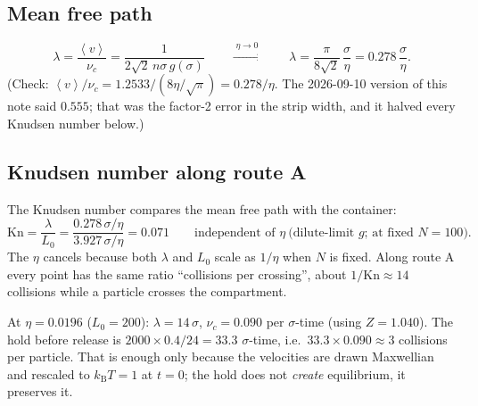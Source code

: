 \documentclass[11pt,a4paper]{article}
\newcommand{\kT}{k_{\mathrm B}T}
\newcommand{\ie}{i.e.\ }
\newcommand{\avg}[1]{\left\langle #1 \right\rangle}
\begin{document}
\subsection{Mean free path}
\begin{equation}
\lambda = \frac{\avg v}{\nu_c} = \frac{1}{2\sqrt2\, n\sigma\, g(\sigma)}
\qquad\xrightarrow{\;\eta\to0\;}\qquad
\lambda = \frac{\pi}{8\sqrt2}\,\frac{\sigma}{\eta} = 0.278\,\frac{\sigma}{\eta}.
\label{eq:lambda}
\end{equation}
(Check: $\avg v/\nu_c = 1.2533/(8\eta/\sqrt\pi) = 0.278/\eta$. The 2026-09-10 version of this note said $0.555$; that was the factor-2 error in the strip width, and it halved every Knudsen number below.)

\subsection{Knudsen number along route A}
The Knudsen number compares the mean free path with the container:
\begin{equation}
\mathrm{Kn} = \frac{\lambda}{L_0} = \frac{0.278\,\sigma/\eta}{3.927\,\sigma/\eta} = 0.071
\qquad\text{independent of }\eta\ \text{(dilute-limit }g\text{; at fixed }N=100).
\label{eq:Kn}
\end{equation}
The $\eta$ cancels because both $\lambda$ and $L_0$ scale as $1/\eta$ when $N$ is fixed. Along route A every point has the same ratio ``collisions per crossing'', about $1/\mathrm{Kn} \approx 14$ collisions while a particle crosses the compartment.

\begin{worked}
At $\eta = 0.0196$ ($L_0 = 200$): $\lambda = 14\,\sigma$, $\nu_c = 0.090$ per $\sigma$-time (using $Z = 1.040$). The hold before release is $2000\times0.4/24 = 33.3$ $\sigma$-time, \ie $33.3\times0.090 \approx 3$ collisions per particle. That is enough only because the velocities are drawn Maxwellian and rescaled to $\kT = 1$ at $t = 0$; the hold does not \emph{create} equilibrium, it preserves it.
\end{worked}
\end{document}
